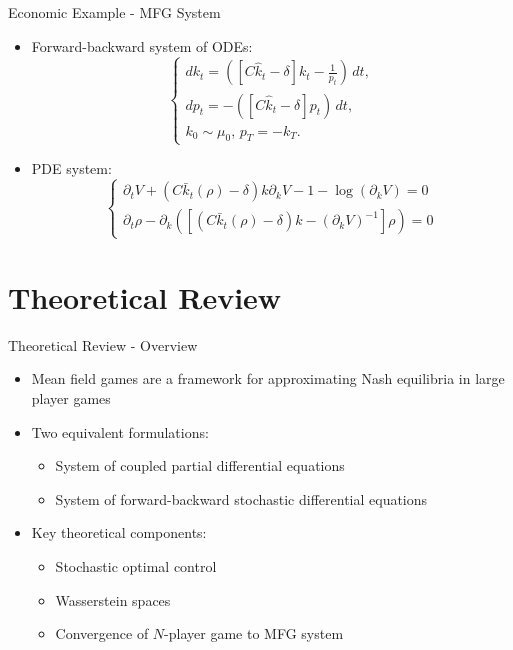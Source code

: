 \documentclass[xcolor=dvipsnames,t,aspectratio=170]{beamer} %
\begin{document}
\begin{frame}{Economic Example - MFG System}
\begin{itemize}
    \item Forward-backward system of ODEs:
    \begin{equation}
        \begin{cases}
             d k_t = \left(\left[ C {\hat k_t} - \delta \right] k_t - \frac{1}{p_t} \right)\, dt,\\
             d p_t = - \left( \left[C{\hat k_t} - \delta \right] p_t \right) \, dt, \\
             k_0 \sim \mu_0,\, p_T =  - k_T.         
        \end{cases}
    \end{equation}
    \item PDE system:
    \begin{equation}
        \begin{cases}
            \partial_t V +  \left(C {\bar k_t(\rho) - \delta}\right)k\partial_k V - 1  - \log(\partial_k V) = 0 \\
            \partial_t \rho - \partial_k \left( \left[ \left(C {\bar k_t}(\rho) - \delta\right) k - {(\partial_k V)}^{-1} \right]\rho \right) = 0
        \end{cases}
    \end{equation}
\end{itemize}
\end{frame}

\section{Theoretical Review}

\begin{frame}{Theoretical Review - Overview}
\begin{itemize}
    \item Mean field games are a framework for approximating Nash equilibria in large player games
    \item Two equivalent formulations:
    \begin{itemize}
        \item System of coupled partial differential equations
        \item System of forward-backward stochastic differential equations
    \end{itemize}
    \item Key theoretical components:
    \begin{itemize}
        \item Stochastic optimal control
        \item Wasserstein spaces
        \item Convergence of $N$-player game to MFG system
    \end{itemize}
\end{itemize}
\end{frame}
\end{document}

